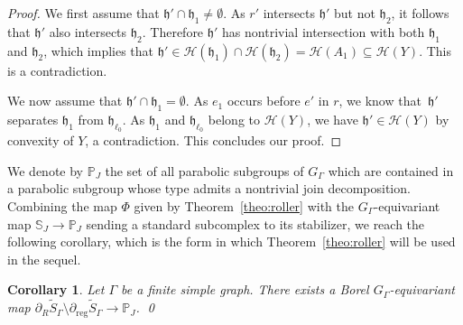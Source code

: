 \documentclass[JEP,XML,SOM,Unicode,NoFloatCountersInSection,published]{cedram}
\let\mathcal\mathscr
\theoremstyle{plain}
\newtheorem{cor}[theo]{Corollary}
\theoremstyle{definition}
\newcommand{\calh}{\mathcal{H}}
\newcommand{\reg}{\mathrm{reg}}
\begin{document}
\begin{proof}
We first assume that $\mathfrak h'\cap \mathfrak h_1\neq\emptyset$. As $r'$ intersects $\mathfrak h'$ but not $\mathfrak{h}_2$, it follows that $\mathfrak{h}'$ also intersects $\mathfrak{h}_2$. Therefore $\mathfrak{h}'$ has nontrivial intersection with both $\mathfrak h_1$ and $\mathfrak h_2$, which implies that $\mathfrak h'\in\calh(\mathfrak h_1)\cap \calh(\mathfrak h_2)=\calh(A_1)\subseteq\calh(Y)$. This is a contradiction.

We now assume that $\mathfrak h'\cap \mathfrak h_1=\emptyset$. As $e_1$ occurs before $e'$ in $r$, we know that~$\mathfrak h'$ separates $\mathfrak h_1$ from $\mathfrak h_{\ell_0}$. As $\mathfrak h_1$ and $\mathfrak h_{\ell_0}$ belong to $\calh(Y)$, we have $\mathfrak h'\in \calh(Y)$ by convexity of $Y$, a contradiction. This concludes our proof.
\end{proof}

We denote by $\mathbb P_J$ the set of all parabolic subgroups of $G_\Gamma$ which are contained in a parabolic subgroup whose type admits a nontrivial join decomposition. Combining the map $\Phi$ given by Theorem~\ref{theo:roller} with the $G_\Gamma$-equivariant map $\mathbb{S}_J\to\mathbb{P}_J$ sending a standard subcomplex to its stabilizer, we reach the following corollary, which is the form in which Theorem~\ref{theo:roller} will be used in the sequel.

\begin{cor}\label{cor:roller}
Let $\Gamma$ be a finite simple graph. There exists a Borel $G_\Gamma$-equivariant map $\partial_R\widetilde{S}_\Gamma\setminus\partial_\reg\widetilde{S}_\Gamma\to\mathbb{P}_J$.
\qed
\end{cor}
\end{document}
